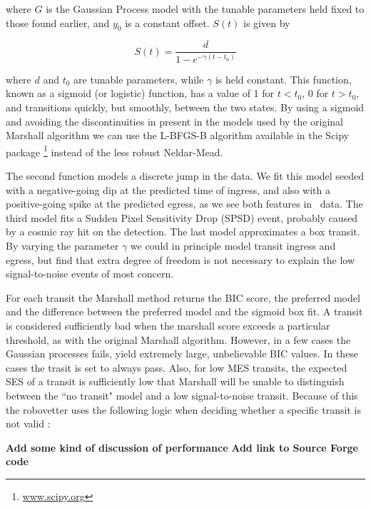 \noindent
where $G$ is the Gaussian Process model with the tunable parameters held fixed to those found earlier, and $y_0$ is a constant offset. $S(t)$ is given by

\begin{equation}
S(t) = \frac{d}{1 - e^{-\gamma (t-t_0)} }
\end{equation}

\noindent
where $d$ and $t_0$ are tunable parameters, while $\gamma$ is held constant. This function, known as a sigmoid (or logistic) function, has a value of 1 for $t<t_0$, 0 for $t>t_0$, and transitions quickly, but smoothly, between the two states. By using a sigmoid and avoiding the discontinuities in present in the models used by the original Marshall algorithm we can use the L-BFGS-B algorithm \citep{Byrd95} available in the Scipy package \footnote{\url{www.scipy.org}} instead of the less robust Neldar-Mead.

The second function models a discrete jump in the data. We fit this model seeded with a negative-going dip at the predicted time of ingress, and also with a positive-going spike at the predicted egress, as we see both features in \Kepler\ data. The third model fits a Sudden Pixel Sensitivity Drop (SPSD) event, probably caused by a cosmic ray hit on the detection. The last model approximates a box transit. By varying the parameter $\gamma$ we could in principle model transit ingress and egress, but find that extra degree of freedom is not necessary to explain the low signal-to-noise events of most concern.

For each transit the Marshall method returns the BIC score, the preferred model and the difference between the preferred model and the sigmoid box fit.  A transit is considered sufficiently bad when the marshall score exceeds a particular threshold, as with the original Marshall algorithm.  However, in a few cases the Gaussian processes fails, yield extremely large, unbelievable BIC values. In these cases the trasit is set to always pass.  Also, for low MES transits, the expected SES of a transit is sufficiently low that Marshall will be unable to distinguish between the ``no transit" model and a low signal-to-noise transit.  Because of this the robovetter uses the following logic when deciding whether a specific transit is not valid :
\begin{equation}

\end{equation}

{\bf Add some kind of discussion of performance}
{\bf Add link to Source Forge code}
 
